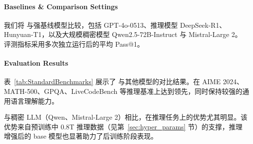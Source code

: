 \paragraph{Baselines \& Comparison Settings} 我们将 \modelname 与强基线模型比较，包括 GPT-4o-0513、推理模型 DeepSeek-R1、Hunyuan-T1，以及大规模稠密模型 Qwen2.5-72B-Instruct 与 Mistral-Large 2。
评测指标采用多次独立运行后的平均 Pass@1。

\paragraph{Evaluation Results}
表~\ref{tab:StandardBenchmarks} 展示了 \modelname 与其他模型的对比结果。\modelname 在 AIME 2024、MATH-500、GPQA、LiveCodeBench 等推理基准上达到领先，同时保持较强的通用语言理解能力。

与稠密 LLM（Qwen、Mistral-Large 2）相比，\modelname 在推理任务上的优势尤其明显。该优势来自预训练中 0.8T 推理数据（见第~\ref{sec:hyper_params} 节）的支撑，推理增强后的 base 模型也显著助力了后训练阶段表现。



\begin{table}[!h]
    \centering
    \caption{\modelname~与代表性模型在各基准上的比较。$\dagger$ 表示结果来自 Artificial Analysis~\cite{ai_analysis}。}
    \label{tab:StandardBenchmarks}
\end{table}

